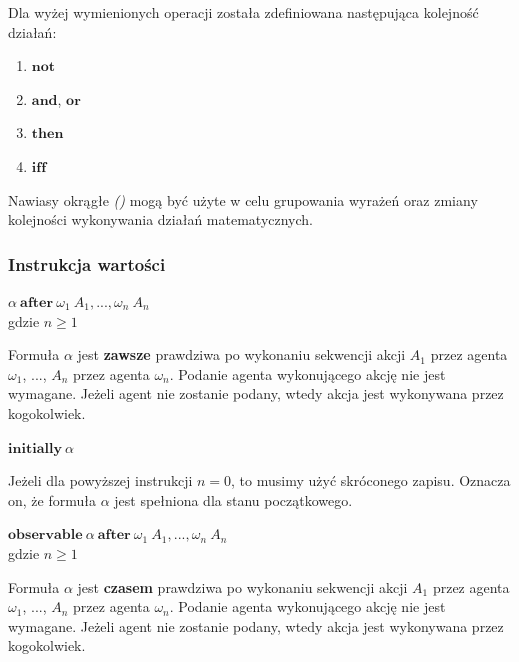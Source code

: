\documentclass[11pt,a4paper]{article}
\begin{document}
    Dla wyżej wymienionych operacji została zdefiniowana następująca kolejność działań:
    \begin{enumerate}
        \item $\mathbf{not}$
        \item $\mathbf{and}$, $\mathbf{or}$
        \item $\mathbf{then}$
        \item $\mathbf{iff}$
    \end{enumerate}
   
    Nawiasy okrągłe \textit{()} mogą być użyte w celu grupowania wyrażeń oraz zmiany kolejności wykonywania działań matematycznych.
    
    \subsubsection{Instrukcja wartości}
    
    \begin{center}
        $\alpha~\mathbf{after}~\omega_1~A_1,...,\omega_n~A_n$
        \\gdzie $n \geq 1$
    \end{center}
    Formuła $\alpha$ jest \textbf{zawsze} prawdziwa po wykonaniu sekwencji akcji $A_1$ przez agenta $\omega_1$, $...$, $A_n$ przez agenta $\omega_n$. Podanie agenta wykonującego akcję nie jest wymagane. Jeżeli agent nie zostanie podany, wtedy akcja jest wykonywana przez kogokolwiek.
    
    \begin{center}
            $\mathbf{initially}~\alpha$
    \end{center}    
        Jeżeli dla powyższej instrukcji $n=0$, to musimy użyć skróconego zapisu. Oznacza on, że formuła $\alpha$ jest spełniona dla stanu początkowego.
                
    \begin{center}    
        $\mathbf{observable}~\alpha~\mathbf{after}~\omega_1~A_1,...,\omega_n~A_n$
        \\gdzie $n \geq 1$
    \end{center}
    Formuła $\alpha$ jest \textbf{czasem} prawdziwa po wykonaniu sekwencji akcji $A_1$ przez agenta $\omega_1$, $...$, $A_n$ przez agenta $\omega_n$. Podanie agenta wykonującego akcję nie jest wymagane. Jeżeli agent nie zostanie podany, wtedy akcja jest wykonywana przez kogokolwiek.
    
\end{document}
